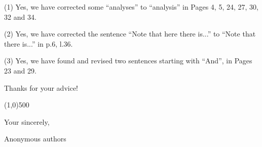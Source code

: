 \documentclass{letter}
\begin{document}
(1) Yes, we have corrected some ``analyses'' to ``analysis'' in Pages 4, 5, 24, 27, 30, 32 and 34.

(2) Yes, we have corrected the sentence ``Note that here there is...'' to ``Note that there is...'' in p.6, l.36.

(3) Yes, we have found and revised two sentences starting with ``And'', in Pages 23 and 29.

Thanks for your advice!

\line(1,0){500}



Your sincerely,

Anonymous authors

%
%
\end{document}
